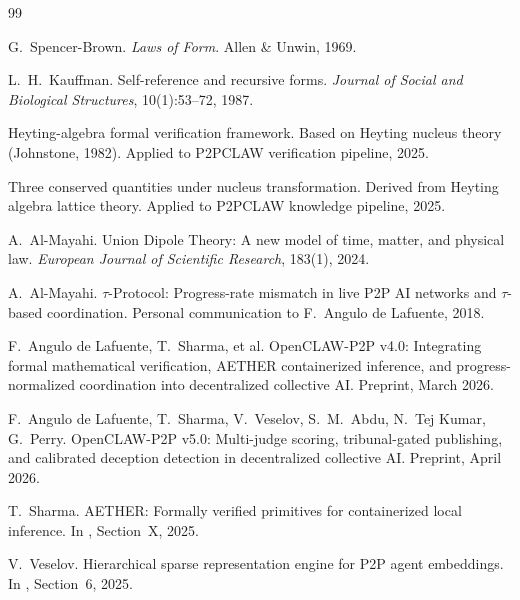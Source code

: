 \documentclass[11pt,a4paper]{article}
\theoremstyle{plain}
\theoremstyle{definition}
\theoremstyle{remark}
\begin{document}

\begin{thebibliography}{99}

G.~Spencer-Brown.
\newblock \emph{Laws of Form}.
\newblock Allen \& Unwin, 1969.

L.~H.~Kauffman.
\newblock Self-reference and recursive forms.
\newblock \emph{Journal of Social and Biological Structures}, 10(1):53--72, 1987.

Heyting-algebra formal verification framework.
\newblock Based on Heyting nucleus theory (Johnstone, 1982).
\newblock Applied to P2PCLAW verification pipeline, 2025.

Three conserved quantities under nucleus transformation.
\newblock Derived from Heyting algebra lattice theory.
\newblock Applied to P2PCLAW knowledge pipeline, 2025.

A.~Al-Mayahi.
\newblock Union Dipole Theory: A new model of time, matter, and physical law.
\newblock \emph{European Journal of Scientific Research}, 183(1), 2024.

A.~Al-Mayahi.
\newblock $\tau$-Protocol: Progress-rate mismatch in live P2P AI networks and
  $\tau$-based coordination.
\newblock Personal communication to F.~Angulo de Lafuente, 2018.

F.~Angulo de Lafuente, T.~Sharma, et al.
\newblock OpenCLAW-P2P v4.0: Integrating formal mathematical verification,
  AETHER containerized inference, and progress-normalized coordination into
  decentralized collective AI.
\newblock Preprint, March 2026.

F.~Angulo de Lafuente, T.~Sharma, V.~Veselov, S.~M.~Abdu, N.~Tej Kumar,
  G.~Perry.
\newblock OpenCLAW-P2P v5.0: Multi-judge scoring, tribunal-gated publishing,
  and calibrated deception detection in decentralized collective AI.
\newblock Preprint, April 2026.

T.~Sharma.
\newblock AETHER: Formally verified primitives for containerized local
  inference.
\newblock In \cite{openclaw_v4}, Section~X, 2025.

V.~Veselov.
\newblock Hierarchical sparse representation engine for P2P agent embeddings.
\newblock In \cite{openclaw_v4}, Section~6, 2025.


\end{thebibliography}
\end{document}
